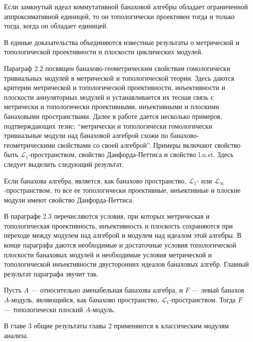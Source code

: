 \begin{theorem*}[2.1.16] Если замкнутый идеал коммутативной банаховой алгебры
    обладает ограниченной аппроксимативной единицей, то он топологически
    проективен тогда и только тогда, когда он обладает единицей.
\end{theorem*}

В единые доказательства объединяются известные результаты о метрической и
топологической проективности и плоскости циклических модулей.

Параграф 2.2 посвящен банахово-геометрическим свойствам гомологически
тривиальных модулей в метрической и топологической теории. Здесь даются критерии
метрической и топологической проективности, инъективности и плоскости
аннуляторных модулей и устанавливается их тесная связь с метрически и
топологически проективными, инъективными и плоскими банаховыми пространствами.
Далее в работе дается несколько примеров, подтверждающих тезис: ``метрически и
топологически гомологически тривиальные модули над банаховой алгеброй схожи по
банахово-геометрическими свойствами со своей алгеброй''. Примеры включают
свойство быть $\mathscr{L}_1$-пространством, свойство Данфорда-Петтиса и
свойство l.u.st. Здесь следует выделить следующий результат.

\begin{theorem*}[2.2.13] Если банахова алгебра, является, как банахово
    пространство, $\mathscr{L}_1$- или $\mathscr{L}_\infty$-пространством, то
    все ее топологически проективные, инъективные и плоские модули имеют
    свойство Данфорда-Петтиса.
\end{theorem*}

В параграфе 2.3 перечисляются условия, при которых метрическая и топологическая
проективность, инъективность и плоскость сохраняются при переходе между модулем
над алгеброй и модулем над идеалом этой алгебры. В конце параграфа даются
необходимые и достаточные условия топологической плоскости банаховых модулей и
необходимые условия метрической и топологической инъективности двусторонних
идеалов банаховых алгебр. Главный результат параграфа звучит так.

\begin{theorem*}[2.3.9] Пусть $A$ --- относительно аменабельная банахова
    алгебра, и $F$ --- левый банахов $A$-модуль, являющийся, как банахово
    пространство, $\mathscr{L}_1$-пространством. Тогда $F$ --- топологически
    плоский $A$-модуль.
\end{theorem*}

В главе 3 общие результаты главы 2 применяются к классическим модулям анализа.

